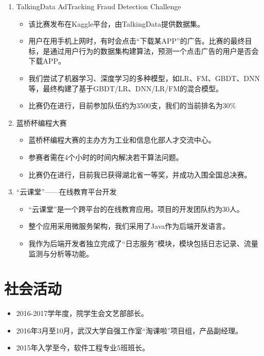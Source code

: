 \documentclass[letterpaper]{twentysecondcv} %
\begin{document}
\begin{CJK*}{UTF8}{gbsn}
\begin{enumerate}
	\item TalkingData AdTracking Fraud Detection Challenge
		\begin{itemize}
			\item 该比赛发布在Kaggle平台，由TalkingData提供数据集。
			\item 用户在用手机上网时，有时会点击“下载某APP”的广告。比赛的最终目标，是通过用户行为的数据集构建算法，预测一个点击广告的用户是否会下载APP。
			\item 我们尝试了机器学习、深度学习的多种模型，如LR、FM、GBDT、DNN等，最终构建了基于GBDT/LR、DNN/LR/FM的混合模型。
			\item 比赛仍在进行，目前参加队伍约为3500支，我们的当前排名为30\%
		\end{itemize}
	\item 蓝桥杯编程大赛
		\begin{itemize}
			\item 蓝桥杯编程大赛的主办方为工业和信息化部人才交流中心。
			\item 参赛者需在4个小时的时间内解决若干算法问题。
			\item 比赛仍在进行，目前我已获得湖北省一等奖，并成功入围全国总决赛。
		\end{itemize}
	\item “云课堂”——在线教育平台开发
		\begin{itemize}
			\item “云课堂”是一个跨平台的在线教育应用。项目的开发团队约为30人。
			\item 整个应用采用微服务架构，我们采用了Java作为后端开发语言。
			\item 我作为后端开发者独立完成了“日志服务”模块，模块包括日志记录、流量监测与分析等功能。
		\end{itemize}
\end{enumerate}


\section{社会活动}

\begin{itemize}
	\item 2016-2017学年度，院学生会文艺部部长。
	\item 2016年3月至10月，武汉大学自强工作室“淘课啦”项目组，产品副经理。
	\item 2015年入学至今，软件工程专业5班班长。
\end{itemize}


\end{CJK*}
\end{document}
